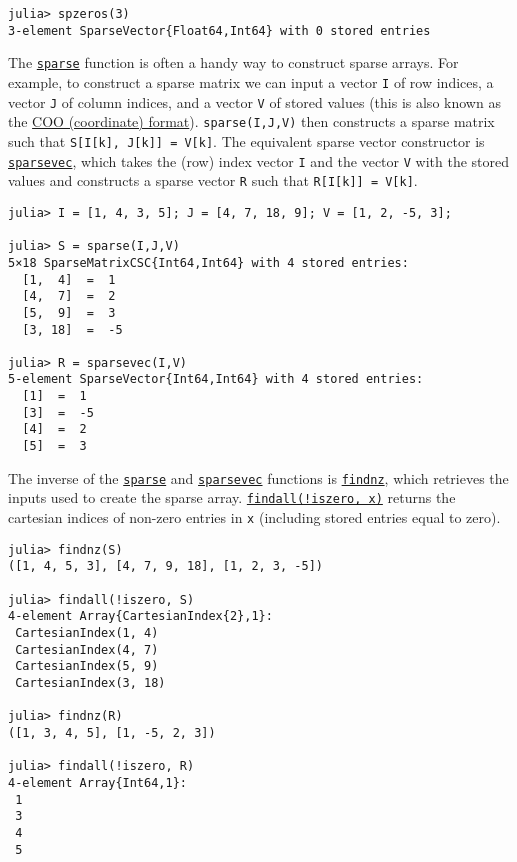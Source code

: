 \begin{verbatim}
julia> spzeros(3)
3-element SparseVector{Float64,Int64} with 0 stored entries
\end{verbatim}



The \hyperlink{10167157011990389788}{\texttt{sparse}} function is often a handy way to construct sparse arrays. For example, to construct a sparse matrix we can input a vector \texttt{I} of row indices, a vector \texttt{J} of column indices, and a vector \texttt{V} of stored values (this is also known as the \href{https://en.wikipedia.org/wiki/Sparse\_matrix\#Coordinate\_list\_.28COO.29}{COO (coordinate) format}). \texttt{sparse(I,J,V)} then constructs a sparse matrix such that \texttt{S[I[k], J[k]] = V[k]}. The equivalent sparse vector constructor is \hyperlink{13364181309585533450}{\texttt{sparsevec}}, which takes the (row) index vector \texttt{I} and the vector \texttt{V} with the stored values and constructs a sparse vector \texttt{R} such that \texttt{R[I[k]] = V[k]}.




\begin{verbatim}
julia> I = [1, 4, 3, 5]; J = [4, 7, 18, 9]; V = [1, 2, -5, 3];

julia> S = sparse(I,J,V)
5×18 SparseMatrixCSC{Int64,Int64} with 4 stored entries:
  [1,  4]  =  1
  [4,  7]  =  2
  [5,  9]  =  3
  [3, 18]  =  -5

julia> R = sparsevec(I,V)
5-element SparseVector{Int64,Int64} with 4 stored entries:
  [1]  =  1
  [3]  =  -5
  [4]  =  2
  [5]  =  3
\end{verbatim}



The inverse of the \hyperlink{10167157011990389788}{\texttt{sparse}} and \hyperlink{13364181309585533450}{\texttt{sparsevec}} functions is \hyperlink{15430174447643444721}{\texttt{findnz}}, which retrieves the inputs used to create the sparse array. \hyperlink{16067208921941164599}{\texttt{findall(!iszero, x)}} returns the cartesian indices of non-zero entries in \texttt{x} (including stored entries equal to zero).




\begin{verbatim}
julia> findnz(S)
([1, 4, 5, 3], [4, 7, 9, 18], [1, 2, 3, -5])

julia> findall(!iszero, S)
4-element Array{CartesianIndex{2},1}:
 CartesianIndex(1, 4)
 CartesianIndex(4, 7)
 CartesianIndex(5, 9)
 CartesianIndex(3, 18)

julia> findnz(R)
([1, 3, 4, 5], [1, -5, 2, 3])

julia> findall(!iszero, R)
4-element Array{Int64,1}:
 1
 3
 4
 5
\end{verbatim}



